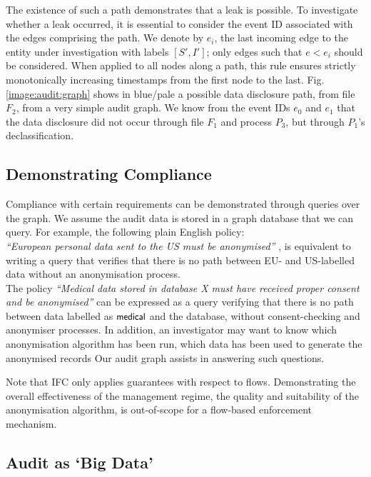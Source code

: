 \documentclass[10pt,journal,compsoc]{IEEEtran}
\begin{document}
The existence of such a path demonstrates that a leak is possible. To investigate whether a leak occurred, it is essential to consider the event ID associated with the edges comprising the path.
We denote by $e_i$, the last incoming edge to the entity under investigation with labels $[S', I']$; only edges such that $e<e_i$ should be considered.
When applied to all nodes along a path, this rule ensures strictly monotonically increasing timestamps from the first node to the last. 
Fig. \ref{image:audit:graph} shows in blue\slash pale a possible data disclosure path, from file $F_2$, from a very simple audit graph. We know from the event IDs $e_0$ and $e_1$ that the data disclosure did not occur through file $F_1$ and process $P_3$, but through $P_1$'s declassification. 




\subsection{Demonstrating Compliance}


Compliance with certain requirements  can be demonstrated through queries over the graph.
We assume the audit data is stored in a graph database that we can query.
For example, the following plain English policy:\\
\emph{``European personal data sent to the US must be anonymised''}
\cite{pasquier2014.claw}, is equivalent to writing a query that verifies that there is no path between EU- and US-labelled data without an anonymisation process. \\
The policy \emph{``Medical data stored in database X must have received proper consent and be anonymised''} \cite{singh2015:claw-magazine} 
can be expressed as a query verifying that there is no path between data labelled as $\textsf{\small medical}$ and the database, without consent-checking and anonymiser processes. In addition, an investigator may want to know which anonymisation algorithm has been run, which data has been used to generate the anonymised records \etc 
Our audit graph assists in answering such questions.

Note that IFC only applies guarantees with respect to flows. Demonstrating the overall effectiveness of the management regime, \eg the quality and suitability of the anonymisation algorithm, is out-of-scope for a flow-based enforcement mechanism.




\subsection{Audit as `Big Data'}
\end{document}
